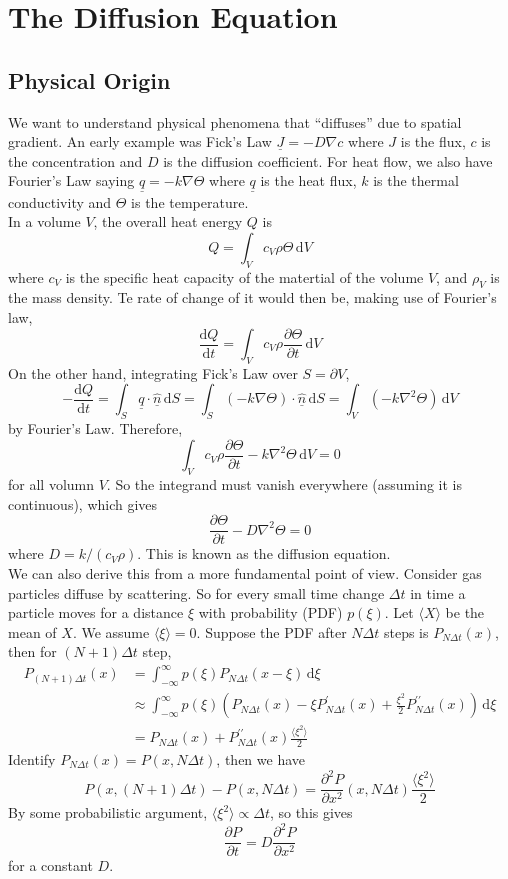 \section{The Diffusion Equation}
\subsection{Physical Origin}
We want to understand physical phenomena that ``diffuses'' due to spatial gradient.
An early example was Fick's Law $\underline{J}=-D\nabla c$ where $J$ is the flux, $c$ is the concentration and $D$ is the diffusion coefficient.
For heat flow, we also have Fourier's Law saying $\underline{q}=-k\nabla\Theta$ where $\underline{q}$ is the heat flux, $k$ is the thermal conductivity and $\Theta$ is the temperature.\\
In a volume $V$, the overall heat energy $Q$ is
$$Q=\int_V c_V\rho\Theta\,\mathrm dV$$
where $c_V$ is the specific heat capacity of the matertial of the volume $V$, and $\rho_V$ is the mass density.
Te rate of change of it would then be, making use of Fourier's law,
$$\frac{\mathrm dQ}{\mathrm dt}=\int_Vc_V\rho\frac{\partial\Theta}{\partial t}\,\mathrm dV$$
On the other hand, integrating Fick's Law over $S=\partial V$,
$$-\frac{\mathrm dQ}{\mathrm dt}=\int_S\underline{q}\cdot\underline{\hat{n}}\,\mathrm dS=\int_S(-k\nabla\Theta)\cdot\underline{\hat{n}}\,\mathrm dS=\int_V(-k\nabla^2\Theta)\,\mathrm dV$$
by Fourier's Law.
Therefore,
$$\int_Vc_V\rho\frac{\partial\Theta}{\partial t}-k\nabla^2\Theta\,\mathrm dV=0$$
for all volumn $V$.
So the integrand must vanish everywhere (assuming it is continuous), which gives
$$\frac{\partial\Theta}{\partial t}-D\nabla^2\Theta=0$$
where $D=k/(c_V\rho)$.
This is known as the diffusion equation.\\
We can also derive this from a more fundamental point of view.
Consider gas particles diffuse by scattering.
So for every small time change $\Delta t$ in time a particle moves for a distance $\xi$ with probability (PDF) $p(\xi)$.
Let $\langle X\rangle$ be the mean of $X$.
We assume $\langle\xi\rangle=0$.
Suppose the PDF after $N\Delta t$ steps is $P_{N\Delta t}(x)$, then for $(N+1)\Delta t$ step,
\begin{align*}
    P_{(N+1)\Delta t}(x)&=\int_{-\infty}^\infty p(\xi)P_{N\Delta t}(x-\xi)\,\mathrm d\xi\\
    &\approx \int_{-\infty}^\infty p(\xi)\left(P_{N\Delta t}(x)-\xi P_{N\Delta t}^\prime(x)+\frac{\xi^2}{2}P_{N\Delta t}^{\prime\prime}(x)\right)\,\mathrm d\xi\\
    &=P_{N\Delta t}(x)+P_{N\Delta t}^{\prime\prime}(x)\frac{\langle\xi^2\rangle}{2}
\end{align*}
Identify $P_{N\Delta t}(x)=P(x,N\Delta t)$, then we have
$$P(x,(N+1)\Delta t)-P(x,N\Delta t)=\frac{\partial^2P}{\partial x^2}(x,N\Delta t)\frac{\langle\xi^2\rangle}{2}$$
By some probabilistic argument, $\langle\xi^2\rangle\propto\Delta t$, so this gives
$$\frac{\partial P}{\partial t}=D\frac{\partial^2P}{\partial x^2}$$
for a constant $D$.
